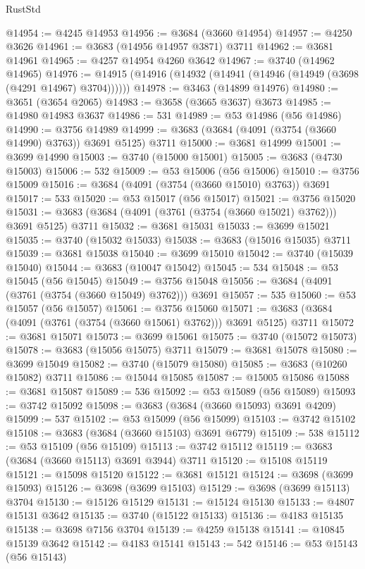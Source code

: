 \begin{lexlean}{RustStd}
\begin{coremodule}
{\begin{coremodule}
{{{{{{{{{{{{{{{{{{{{{{{{{{{{{{{{{{{{{{{{{{{{{{{@14954 := @4245 @14953
@14956 := @3684 (@3660 @14954)
@14957 := @4250 @3626
@14961 := @3683 (@14956 @14957 @3871) @3711
@14962 := @3681 @14961
@14965 := @4257 @14954 @4260 @3642
@14967 := @3740 (@14962 @14965)
@14976 := @14915 (@14916 (@14932 (@14941 (@14946 (@14949 (@3698 (@4291 @14967) @3704))))))
@14978 := @3463 (@14899 @14976)
@14980 := @3651 (@3654 @2065)
@14983 := @3658 (@3665 @3637) @3673
@14985 := @14980 @14983 @3637
@14986 := 531
@14989 := @53 @14986 (@56 @14986)
@14990 := @3756 @14989
@14999 := @3683 (@3684 (@4091 (@3754 (@3660 @14990) @3763)) @3691 @5125) @3711
@15000 := @3681 @14999
@15001 := @3699 @14990
@15003 := @3740 (@15000 @15001)
@15005 := @3683 (@4730 @15003)
@15006 := 532
@15009 := @53 @15006 (@56 @15006)
@15010 := @3756 @15009
@15016 := @3684 (@4091 (@3754 (@3660 @15010) @3763)) @3691
@15017 := 533
@15020 := @53 @15017 (@56 @15017)
@15021 := @3756 @15020
@15031 := @3683 (@3684 (@4091 (@3761 (@3754 (@3660 @15021) @3762))) @3691 @5125) @3711
@15032 := @3681 @15031
@15033 := @3699 @15021
@15035 := @3740 (@15032 @15033)
@15038 := @3683 (@15016 @15035) @3711
@15039 := @3681 @15038
@15040 := @3699 @15010
@15042 := @3740 (@15039 @15040)
@15044 := @3683 (@10047 @15042)
@15045 := 534
@15048 := @53 @15045 (@56 @15045)
@15049 := @3756 @15048
@15056 := @3684 (@4091 (@3761 (@3754 (@3660 @15049) @3762))) @3691
@15057 := 535
@15060 := @53 @15057 (@56 @15057)
@15061 := @3756 @15060
@15071 := @3683 (@3684 (@4091 (@3761 (@3754 (@3660 @15061) @3762))) @3691 @5125) @3711
@15072 := @3681 @15071
@15073 := @3699 @15061
@15075 := @3740 (@15072 @15073)
@15078 := @3683 (@15056 @15075) @3711
@15079 := @3681 @15078
@15080 := @3699 @15049
@15082 := @3740 (@15079 @15080)
@15085 := @3683 (@10260 @15082) @3711
@15086 := @15044 @15085
@15087 := @15005 @15086
@15088 := @3681 @15087
@15089 := 536
@15092 := @53 @15089 (@56 @15089)
@15093 := @3742 @15092
@15098 := @3683 (@3684 (@3660 @15093) @3691 @4209)
@15099 := 537
@15102 := @53 @15099 (@56 @15099)
@15103 := @3742 @15102
@15108 := @3683 (@3684 (@3660 @15103) @3691 @6779)
@15109 := 538
@15112 := @53 @15109 (@56 @15109)
@15113 := @3742 @15112
@15119 := @3683 (@3684 (@3660 @15113) @3691 @3944) @3711
@15120 := @15108 @15119
@15121 := @15098 @15120
@15122 := @3681 @15121
@15124 := @3698 (@3699 @15093)
@15126 := @3698 (@3699 @15103)
@15129 := @3698 (@3699 @15113) @3704
@15130 := @15126 @15129
@15131 := @15124 @15130
@15133 := @4807 @15131 @3642
@15135 := @3740 (@15122 @15133)
@15136 := @4183 @15135
@15138 := @3698 @7156 @3704
@15139 := @4259 @15138
@15141 := @10845 @15139 @3642
@15142 := @4183 @15141
@15143 := 542
@15146 := @53 @15143 (@56 @15143)
}}}}}}}}}}}}}}}}}}}}}}}}}}}}}}}}}}}}}}}}}}}}}}}
\end{coremodule}}
\end{coremodule}
\end{lexlean}
